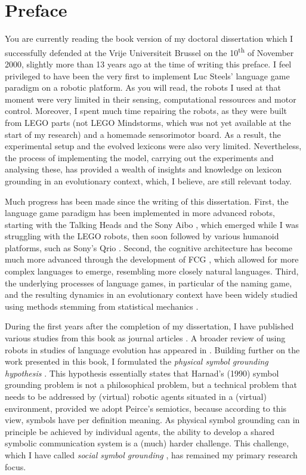\chapter*{Preface}

You are currently reading the book version of my doctoral dissertation which I successfully defended at the Vrije Universiteit Brussel on the 10\textsuperscript{th} of November 2000, slightly more than 13 years ago at the time of writing this preface. I feel privileged to have been the very first to implement Luc Steels' language game paradigm on a robotic platform. As you will read, the robots I used at that moment were very limited in their sensing, computational ressources and motor control. Moreover, I spent much time repairing the robots, as they were built from LEGO parts (not LEGO Mindstorms, which was not yet available at the start of my research) and a homemade sensorimotor board. As a result, the experimental setup and the evolved lexicons were also very limited. Nevertheless, the process of implementing the model, carrying out the experiments and analysing these, has provided a wealth of insights and knowledge on lexicon grounding in an evolutionary context, which, I believe, are still relevant today.

Much progress has been made since the writing of this dissertation. First, the language game paradigm has been implemented in more advanced robots, starting with the Talking Heads \citep{steelsetal:2002} and the Sony Aibo \citep{steelskaplan:2000}, which emerged while I was struggling with the LEGO robots, then soon followed by various humanoid platforms, such as Sony's Qrio \citep[see, e.g., ][ and this book series]{steels:2012}. Second, the cognitive architecture has become much more advanced through the development of FCG \citep{steelsdebeule:2006}, which allowed for more complex languages to emerge, resembling more closely natural languages. Third, the underlying processes of language games, in particular of the naming game, and the resulting dynamics in an evolutionary context have been widely studied using methods stemming from statistical mechanics \citep[e.g., ][]{baronchellietal:2006a}.

During the first years after the completion of my dissertation, I have published various studies from this book as journal articles \citep{vogt:2000c,vogt:2002a,vogt:2003a}. A broader review of using robots in studies of language evolution has appeared in \citet{vogt:2006a}. Building further on the work presented in this book, I formulated the {\em physical symbol grounding hypothesis} \citep{vogt:2002a}. This hypothesis essentially states that Harnad's (1990) symbol grounding problem is not a philosophical problem, but a technical problem that needs to be addressed by (virtual) robotic agents situated in a (virtual) environment, provided we adopt Peirce's semiotics, because according to this view, symbols have per definition meaning. As physical symbol grounding can in principle be achieved by individual agents, the ability to develop a shared symbolic communication system is a (much) harder challenge. This challenge, which I have called {\em social symbol grounding} \citep{vogtdivina:2007}, has remained my primary research focus.

